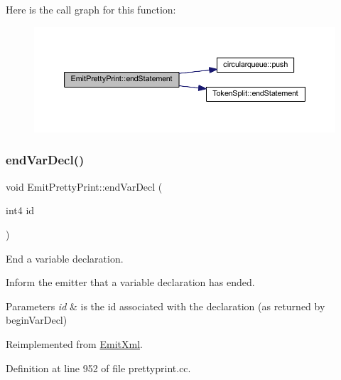 Here is the call graph for this function\+:
\nopagebreak
\begin{figure}[H]
\begin{center}
\leavevmode
\includegraphics[width=350pt]{class_emit_pretty_print_ab19e4ce2f8b1028e41d217d6c762ef7a_cgraph}
\end{center}
\end{figure}
\mbox{\label{class_emit_pretty_print_a468af036c0623c76311ea4d286940936}} 
\subsubsection{\texorpdfstring{endVarDecl()}{endVarDecl()}}
{\footnotesize\ttfamily void Emit\+Pretty\+Print\+::end\+Var\+Decl (\begin{DoxyParamCaption}\item[{int4}]{id }\end{DoxyParamCaption})\hspace{0.3cm}{\ttfamily [virtual]}}



End a variable declaration. 

Inform the emitter that a variable declaration has ended. 
\begin{DoxyParams}{Parameters}
{\em id} & is the id associated with the declaration (as returned by begin\+Var\+Decl) \\
\hline
\end{DoxyParams}


Reimplemented from \mbox{\hyperlink{class_emit_xml_a8700bdf9d4e073ae392ef722f53ceb45}{Emit\+Xml}}.



Definition at line 952 of file prettyprint.\+cc.

